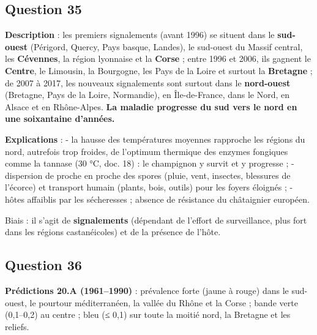 \documentclass[11pt,a4paper]{article}
\begin{document}
\hypertarget{question-35}{%
\subsection{Question 35}\label{question-35}}

\textbf{Description} : les premiers signalements (avant 1996) se situent dans le \textbf{sud-ouest} (Périgord, Quercy, Pays basque, Landes), le sud-ouest du Massif central, les \textbf{Cévennes}, la région lyonnaise et la \textbf{Corse} ; entre 1996 et 2006, ils gagnent le \textbf{Centre}, le Limousin, la Bourgogne, les Pays de la Loire et surtout la \textbf{Bretagne} ; de 2007 à 2017, les nouveaux signalements sont surtout dans le \textbf{nord-ouest} (Bretagne, Pays de la Loire, Normandie), en Île-de-France, dans le Nord, en Alsace et en Rhône-Alpes. \textbf{La maladie progresse du sud vers le nord en une soixantaine d'années.}

\textbf{Explications} :
- la hausse des températures moyennes rapproche les régions du nord, autrefois trop froides, de l'optimum thermique des enzymes fongiques comme la tannase (30 °C, doc. 18) : le champignon y survit et y progresse ;
- dispersion de proche en proche des spores (pluie, vent, insectes, blessures de l'écorce) et transport humain (plants, bois, outils) pour les foyers éloignés ;
- hôtes affaiblis par les sécheresses ; absence de résistance du châtaignier européen.

Biais : il s'agit de \textbf{signalements} (dépendant de l'effort de surveillance, plus fort dans les régions castanéicoles) et de la présence de l'hôte.

\hypertarget{question-36}{%
\subsection{Question 36}\label{question-36}}

\textbf{Prédictions 20.A (1961--1990)} : prévalence forte (jaune à rouge) dans le sud-ouest, le pourtour méditerranéen, la vallée du Rhône et la Corse ; bande verte (0,1--0,2) au centre ; bleu (≤ 0,1) sur toute la moitié nord, la Bretagne et les reliefs.
\end{document}

